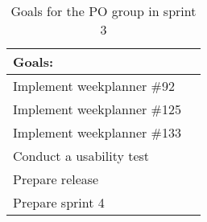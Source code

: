 \begin{table}[H]
    \centering
    \begin{tabular}{|l|l|}
    \hline
    Goals:                                   \\ \hline
    Implement weekplanner \#92               \\ \hline
    Implement weekplanner \#125              \\ \hline
    Implement weekplanner \#133              \\ \hline
    Conduct a usability test                 \\ \hline
    Prepare release                          \\ \hline
    Prepare sprint 4                         \\ \hline
    \end{tabular}
    \caption{Goals for the PO group in sprint 3}
    \label{PO-goal-sprint-3}
\end{table}
